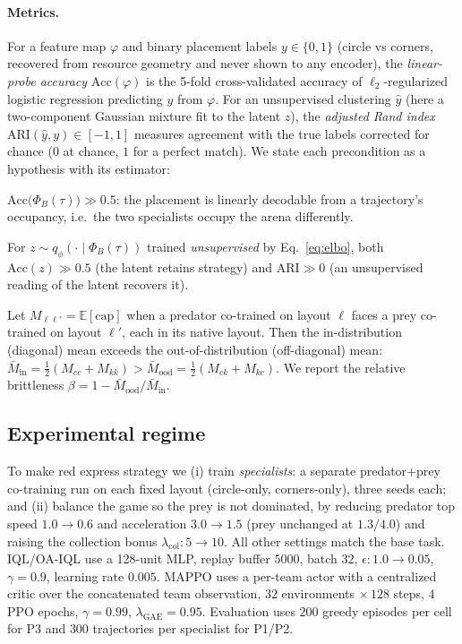 \documentclass[11pt]{article}
\newcommand{\expect}{\mathbb{E}}
\newcommand{\occ}{\Phi}
\newcommand{\zlat}{z}
\begin{document}
\paragraph{Metrics.}
For a feature map $\varphi$ and binary placement labels $y \in \{0,1\}$ (circle
vs corners, recovered from resource geometry and never shown to any encoder), the
\emph{linear-probe accuracy} $\mathrm{Acc}(\varphi)$ is the 5-fold
cross-validated accuracy of $\ell_2$-regularized logistic regression predicting
$y$ from $\varphi$. For an unsupervised clustering $\hat y$ (here a two-component
Gaussian mixture fit to the latent $\zlat$), the \emph{adjusted Rand index}
$\mathrm{ARI}(\hat y, y) \in [-1,1]$ measures agreement with the true labels
corrected for chance ($0$ at chance, $1$ for a perfect match). We state each
precondition as a hypothesis with its estimator:
\begin{description}[style=nextline,font=\normalfont\bfseries,leftmargin=1.2em]
\item[P1 (distinct strategies).] $\mathrm{Acc}\big(\occ_B(\tau)\big) \gg 0.5$:
the placement is linearly decodable from a trajectory's occupancy, i.e.\ the two
specialists occupy the arena differently.
\item[P2 (encodable).] For $\zlat \sim q_\phi(\cdot \mid \occ_B(\tau))$ trained
\emph{unsupervised} by Eq.~\eqref{eq:elbo}, both $\mathrm{Acc}(\zlat) \gg 0.5$
(the latent retains strategy) and $\mathrm{ARI} \gg 0$ (an unsupervised reading
of the latent recovers it).
\item[P3 (brittleness).] Let $M_{\ell\ell'} = \expect[\mathrm{cap}]$ when a
predator co-trained on layout $\ell$ faces a prey co-trained on layout $\ell'$,
each in its native layout. Then the in-distribution (diagonal) mean exceeds the
out-of-distribution (off-diagonal) mean:
$\bar M_{\mathrm{in}} = \tfrac12(M_{cc} + M_{kk})
> \bar M_{\mathrm{ood}} = \tfrac12(M_{ck} + M_{kc})$.
We report the relative brittleness
$\beta = 1 - \bar M_{\mathrm{ood}} / \bar M_{\mathrm{in}}$.
\end{description}

\subsection{Experimental regime}

To make red express strategy we (i) train \emph{specialists}: a separate
predator+prey co-training run on each fixed layout (circle-only, corners-only),
three seeds each; and (ii) balance the game so the prey is not dominated, by
reducing predator top speed $1.0 \to 0.6$ and acceleration $3.0 \to 1.5$ (prey
unchanged at $1.3 / 4.0$) and raising the collection bonus
$\lambda_{\mathrm{col}}: 5 \to 10$. All other settings match the base task.
IQL/OA-IQL use a 128-unit MLP, replay buffer $5000$, batch $32$,
$\epsilon: 1.0 \to 0.05$, $\gamma = 0.9$, learning rate $0.005$. MAPPO uses a
per-team actor with a centralized critic over the concatenated team observation,
$32$ environments $\times\, 128$ steps, $4$ PPO epochs, $\gamma = 0.99$,
$\lambda_{\mathrm{GAE}} = 0.95$. Evaluation uses $200$ greedy episodes per cell
for P3 and $300$ trajectories per specialist for P1/P2.
\end{document}
